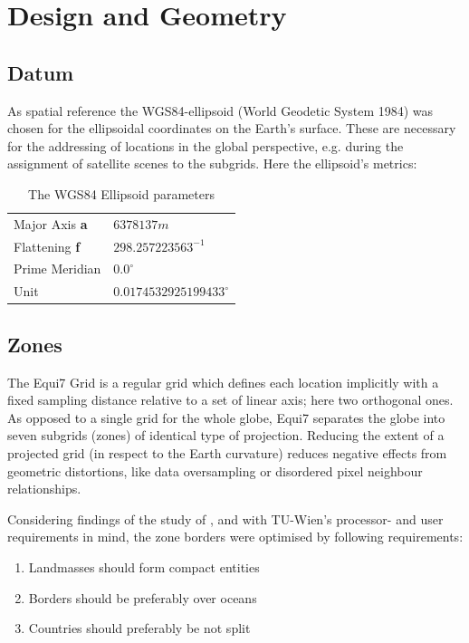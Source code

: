 \documentclass[10pt,a4paper]{article}
\begin{document}
\section{Design and Geometry}
\label{sec:design}

\subsection{Datum}
As spatial reference the WGS84-ellipsoid (World Geodetic System 1984) was chosen for the ellipsoidal coordinates on the Earth's surface. These are necessary for the addressing of locations in the global perspective, e.g. during the assignment of satellite scenes to the subgrids. Here the ellipsoid's metrics:

\begin{table}[hbtp]
\caption[Map Projections]{
The WGS84 Ellipsoid parameters
}
\centering
	{
	\begin{tabular}{ll}
	\hline 
	Major Axis \textbf{a} & $6378137 m$ \\
	Flattening \textbf{f} & $298.257223563^{-1}$ \\
	Prime Meridian & $0.0^{\circ}$ \\
	Unit & $0.0174532925199433^{\circ}$ \\
	\hline 
	\end{tabular} 
	}
\label{tab:wgs84}
\end{table}

\subsection{Zones}
The Equi7 Grid is a regular grid which defines each location implicitly with a fixed sampling distance relative to a set of linear axis; here two orthogonal ones. As opposed to a single grid for the whole globe, Equi7 separates the globe into seven subgrids (zones) of identical type of projection. Reducing the extent of a projected grid (in respect to the Earth curvature) reduces negative effects from geometric distortions, like data oversampling or disordered pixel neighbour relationships.

Considering findings of the study of \citep{Bauer-Marschallinger2014}, and with TU-Wien's processor- and user requirements in mind, the zone borders were optimised by following requirements: 
\begin{enumerate}
\item Landmasses should form compact entities
\item Borders should be preferably over oceans
\item Countries should preferably be not split
\end{enumerate}
\end{document}

